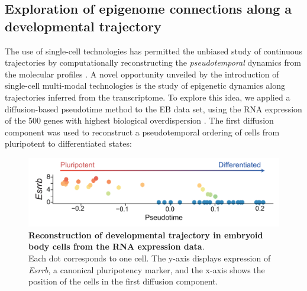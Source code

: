 

\subsection{Exploration of epigenome connections along a developmental trajectory}

The use of single-cell technologies has permitted the unbiased study of continuous trajectories by computationally reconstructing the \textit{pseudotemporal} dynamics from the molecular profiles \cite{Trapnell2014,Haghverdi2016,Saelens2018}. A novel opportunity unveiled by the introduction of single-cell multi-modal technologies is the study of epigenetic dynamics along trajectories inferred from the transcriptome. To explore this idea, we applied a diffusion-based pseudotime method \cite{Haghverdi2016} to the EB data set, using the RNA expression of the 500 genes with highest biological overdispersion \cite{Lun2016b}. The first diffusion component was used to reconstruct a pseudotemporal ordering of cells from pluripotent to differentiated states:

\begin{figure}[H]
	\centering
	\includegraphics[width=0.75\linewidth]{scNMT_pseudotime}
	\caption[]{\textbf{Reconstruction of developmental trajectory in embryoid body cells from the RNA expression data}.\\
	Each dot corresponds to one cell. The y-axis displays expression of \textit{Esrrb}, a canonical pluripotency marker, and the x-axis shows the position of the cells in the first diffusion component.}
	\label{fig:scnmt_pseudotime}
\end{figure}


